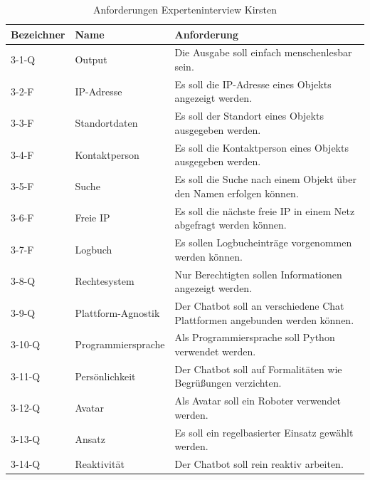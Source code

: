 \begin{table}[H]
\centering
\begin{tabularx}{1\textwidth}{l|l|X}
  Bezeichner & Name & Anforderung \\\hline
  3-1-Q & Output & Die Ausgabe soll einfach menschenlesbar sein. \\
  3-2-F & IP-Adresse & Es soll die IP-Adresse eines Objekts angezeigt werden. \\
  3-3-F & Standortdaten & Es soll der Standort eines Objekts ausgegeben werden. \\
  3-4-F & Kontaktperson & Es soll die Kontaktperson eines Objekts ausgegeben werden. \\
  3-5-F & Suche & Es soll die Suche nach einem Objekt über den Namen erfolgen können.  \\
  3-6-F & Freie IP & Es soll die nächste freie IP in einem Netz abgefragt werden können. \\
  3-7-F & Logbuch & Es sollen Logbucheinträge vorgenommen werden können. \\
  3-8-Q & Rechtesystem & Nur Berechtigten sollen Informationen angezeigt werden. \\
  3-9-Q & Plattform-Agnostik & Der Chatbot soll an verschiedene Chat Plattformen angebunden werden können. \\
  3-10-Q & Programmiersprache & Als Programmiersprache soll Python verwendet werden. \\
  3-11-Q & Persönlichkeit & Der Chatbot soll auf Formalitäten wie Begrüßungen verzichten. \\
  3-12-Q & Avatar & Als Avatar soll ein Roboter verwendet werden. \\
  3-13-Q & Ansatz & Es soll ein regelbasierter Einsatz gewählt werden. \\
  3-14-Q & Reaktivität & Der Chatbot soll rein reaktiv arbeiten. \\
\end{tabularx}
\\\eigen
\caption{Anforderungen Experteninterview Kirsten}
\label{tab:expkirs}
\end{table}

